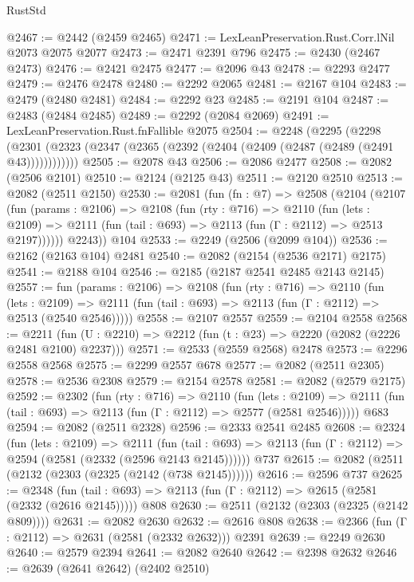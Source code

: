 \begin{lexlean}{RustStd}
\begin{coremodule}
@2467 := @2442 (@2459 @2465)
@2471 := LexLeanPreservation.Rust.Corr.lNil @2073 @2075 @2077
@2473 := @2471 @2391 @796
@2475 := @2430 (@2467 @2473)
@2476 := @2421 @2475
@2477 := @2096 @43
@2478 := @2293 @2477
@2479 := @2476 @2478
@2480 := @2292 @2065
@2481 := @2167 @104
@2483 := @2479 (@2480 @2481)
@2484 := @2292 @23
@2485 := @2191 @104
@2487 := @2483 (@2484 @2485)
@2489 := @2292 (@2084 @2069)
@2491 := LexLeanPreservation.Rust.fnFallible @2075
@2504 := @2248
    (@2295
      (@2298 (@2301 (@2323 (@2347 (@2365 (@2392 (@2404 (@2409 (@2487 (@2489 (@2491 @43))))))))))))
@2505 := @2078 @43
@2506 := @2086 @2477
@2508 := @2082 (@2506 @2101)
@2510 := @2124 (@2125 @43)
@2511 := @2120 @2510
@2513 := @2082 (@2511 @2150)
@2530 := @2081
    (fun (fn : @7) =>
    @2508
      (@2104
        (@2107
          (fun (params : @2106) =>
          @2108
            (fun (rty : @716) =>
            @2110
              (fun (lets : @2109) =>
              @2111 (fun (tail : @693) => @2113 (fun (Γ : @2112) => @2513 @2197))))))
        @2243))
    @104
@2533 := @2249 (@2506 (@2099 @104))
@2536 := @2162 (@2163 @104) @2481
@2540 := @2082 (@2154 (@2536 @2171) @2175)
@2541 := @2188 @104
@2546 := @2185 (@2187 @2541 @2485 @2143 @2145)
@2557 := fun (params : @2106) =>
  @2108
    (fun (rty : @716) =>
    @2110
      (fun (lets : @2109) =>
      @2111 (fun (tail : @693) => @2113 (fun (Γ : @2112) => @2513 (@2540 @2546)))))
@2558 := @2107 @2557
@2559 := @2104 @2558
@2568 := @2211 (fun (U : @2210) => @2212 (fun (t : @23) => @2220 (@2082 (@2226 @2481 @2100) @2237)))
@2571 := @2533 (@2559 @2568) @2478
@2573 := @2296 @2558 @2568
@2575 := @2299 @2557 @678
@2577 := @2082 (@2511 @2305)
@2578 := @2536 @2308
@2579 := @2154 @2578
@2581 := @2082 (@2579 @2175)
@2592 := @2302
    (fun (rty : @716) =>
    @2110
      (fun (lets : @2109) =>
      @2111 (fun (tail : @693) => @2113 (fun (Γ : @2112) => @2577 (@2581 @2546)))))
    @683
@2594 := @2082 (@2511 @2328)
@2596 := @2333 @2541 @2485
@2608 := @2324
    (fun (lets : @2109) =>
    @2111
      (fun (tail : @693) => @2113 (fun (Γ : @2112) => @2594 (@2581 (@2332 (@2596 @2143 @2145))))))
    @737
@2615 := @2082 (@2511 (@2132 (@2303 (@2325 (@2142 (@738 @2145))))))
@2616 := @2596 @737
@2625 := @2348
    (fun (tail : @693) => @2113 (fun (Γ : @2112) => @2615 (@2581 (@2332 (@2616 @2145)))))
    @808
@2630 := @2511 (@2132 (@2303 (@2325 (@2142 @809))))
@2631 := @2082 @2630
@2632 := @2616 @808
@2638 := @2366 (fun (Γ : @2112) => @2631 (@2581 (@2332 @2632))) @2391
@2639 := @2249 @2630
@2640 := @2579 @2394
@2641 := @2082 @2640
@2642 := @2398 @2632
@2646 := @2639 (@2641 @2642) (@2402 @2510)

\end{coremodule}
\end{lexlean}
